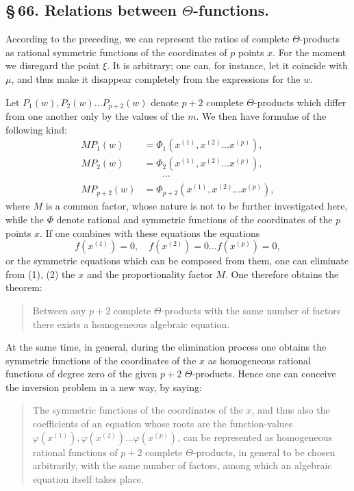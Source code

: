 \documentclass[10pt]{article}
\begin{document}
\subsection*{\S\,66. Relations between \(\Theta\)-functions.}

According to the preceding, we can represent the ratios of complete \(\Theta\)-products as rational symmetric functions of the coordinates of \(p\) points \(x\). For the moment we disregard the point \(\xi\). It is arbitrary; one can, for instance, let it coincide with \(\mu\), and thus make it disappear completely from the expressions for the \(w\).

Let \(P_1(w),P_2(w)\ldots P_{p+2}(w)\) denote \(p+2\) complete \(\Theta\)-products which differ from one another only by the values of the \(m\). We then have formulae of the following kind:
\[
\tag{1}
\begin{aligned}
M P_1(w)&=\Phi_1(x^{(1)},x^{(2)}\ldots x^{(p)}),\\
M P_2(w)&=\Phi_2(x^{(1)},x^{(2)}\ldots x^{(p)}),\\
&\hspace{2em}\cdots\\
M P_{p+2}(w)&=\Phi_{p+2}(x^{(1)},x^{(2)}\ldots x^{(p)}),
\end{aligned}
\]
where \(M\) is a common factor, whose nature is not to be further investigated here, while the \(\Phi\) denote rational and symmetric functions of the coordinates of the \(p\) points \(x\). If one combines with these equations the equations
\[
\tag{2}
f(x^{(1)})=0,\quad f(x^{(2)})=0\ldots f(x^{(p)})=0,
\]
or the symmetric equations which can be composed from them, one can eliminate from (1), (2) the \(x\) and the proportionality factor \(M\). One therefore obtains the theorem:

\begin{quote}
Between any \(p+2\) complete \(\Theta\)-products with the same number of factors there exists a homogeneous algebraic equation.
\end{quote}

At the same time, in general, during the elimination process one obtains the symmetric functions of the coordinates of the \(x\) as homogeneous rational functions of degree zero of the given \(p+2\) \(\Theta\)-products. Hence one can conceive the inversion problem in a new way, by saying:

\begin{quote}
The symmetric functions of the coordinates of the \(x\), and thus also the coefficients of an equation whose roots are the function-values \(\varphi(x^{(1)}),\varphi(x^{(2)})\ldots\varphi(x^{(p)})\), can be represented as homogeneous rational functions of \(p+2\) complete \(\Theta\)-products, in general to be chosen arbitrarily, with the same number of factors, among which an algebraic equation itself takes place.
\end{quote}
\end{document}
